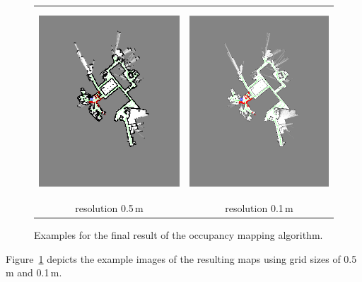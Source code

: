 \documentclass[12pt]{article}
\begin{document}
\begin{figure}
  \centering
  \begin{tabular}{cc}
    \includegraphics[height=7cm]{gridmap_0_5.png} &
    \includegraphics[height=7cm]{gridmap_0_1.png}\\
    resolution 0.5\,m & resolution 0.1\,m
  \end{tabular}
  \caption{Examples for the final result of the occupancy mapping algorithm.}
  \label{fig:examples}
\end{figure}

Figure~\ref{fig:examples} depicts the example images of the resulting
maps using grid sizes of 0.5\,m and 0.1\,m.
\end{document}
